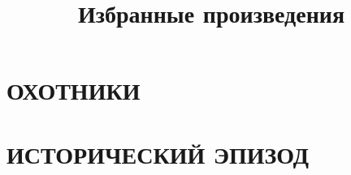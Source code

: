 \documentclass{article}
\title{Избранные произведения}
\date{}
\begin{document}
\maketitle

\section{ОХОТНИКИ}


\section{ИСТОРИЧЕСКИЙ ЭПИЗОД}

\end{document}
